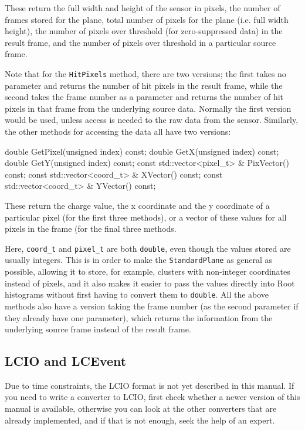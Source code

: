 These return the full width and height of the sensor in pixels,
the number of frames stored for the plane,
total number of pixels for the plane (i.e. full width \x{} height),
the number of pixels over threshold (for zero-suppressed data) in the result frame,
and the number of pixels over threshold in a particular source frame.

Note that for the \texttt{HitPixels} method, there are two versions;
the first takes no parameter and returns the number of hit pixels in the result frame,
while the second takes the frame number as a parameter and returns the number of hit pixels
in that frame from the underlying source data.
Normally the first version would be used, unless access is needed to the raw data from the sensor.
Similarly, the other methods for accessing the data all have two versions:

\begin{listing}
double GetPixel(unsigned index) const;
double GetX(unsigned index) const;
double GetY(unsigned index) const;
const std::vector<pixel_t> & PixVector() const;
const std::vector<coord_t> & XVector() const;
const std::vector<coord_t> & YVector() const;
\end{listing}

These return the charge value, the x coordinate and the y coordinate of a particular pixel
(for the first three methods),
or a vector of these values for all pixels in the frame (for the final three methods.

Here, \texttt{coord\_t} and \texttt{pixel\_t} are both \texttt{double}, even though the values stored are usually integers.
This is in order to make the \texttt{StandardPlane} as general as possible, allowing it to store, for example,
clusters with non-integer coordinates instead of pixels, and it also makes it easier to pass the values directly
into Root histograms without first having to convert them to \texttt{double}.
All the above methods also have a version taking the frame number
(as the second parameter if they already have one parameter),
which returns the information from the underlying source frame instead of the result frame.

\subsection{LCIO and LCEvent}\label{sec:LCIO}
Due to time constraints, the \gls{LCIO} format is not yet described in this manual.
If you need to write a converter to \gls{LCIO},
first check whether a newer version of this manual is available,
otherwise you can look at the other converters that are already implemented,
and if that is not enough, seek the help of an expert.

